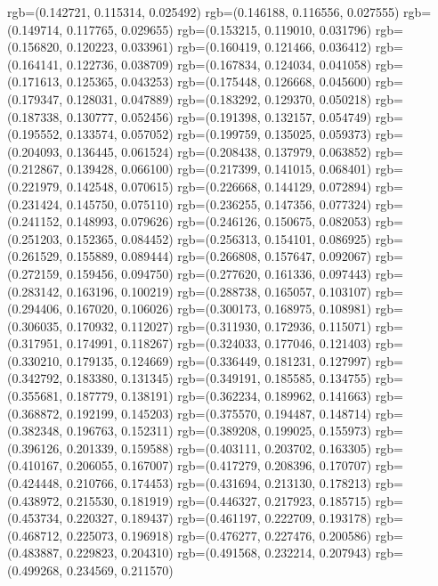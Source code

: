 {{{					rgb=(0.142721, 0.115314, 0.025492)
					rgb=(0.146188, 0.116556, 0.027555)
					rgb=(0.149714, 0.117765, 0.029655)
					rgb=(0.153215, 0.119010, 0.031796)
					rgb=(0.156820, 0.120223, 0.033961)
					rgb=(0.160419, 0.121466, 0.036412)
					rgb=(0.164141, 0.122736, 0.038709)
					rgb=(0.167834, 0.124034, 0.041058)
					rgb=(0.171613, 0.125365, 0.043253)
					rgb=(0.175448, 0.126668, 0.045600)
					rgb=(0.179347, 0.128031, 0.047889)
					rgb=(0.183292, 0.129370, 0.050218)
					rgb=(0.187338, 0.130777, 0.052456)
					rgb=(0.191398, 0.132157, 0.054749)
					rgb=(0.195552, 0.133574, 0.057052)
					rgb=(0.199759, 0.135025, 0.059373)
					rgb=(0.204093, 0.136445, 0.061524)
					rgb=(0.208438, 0.137979, 0.063852)
					rgb=(0.212867, 0.139428, 0.066100)
					rgb=(0.217399, 0.141015, 0.068401)
					rgb=(0.221979, 0.142548, 0.070615)
					rgb=(0.226668, 0.144129, 0.072894)
					rgb=(0.231424, 0.145750, 0.075110)
					rgb=(0.236255, 0.147356, 0.077324)
					rgb=(0.241152, 0.148993, 0.079626)
					rgb=(0.246126, 0.150675, 0.082053)
					rgb=(0.251203, 0.152365, 0.084452)
					rgb=(0.256313, 0.154101, 0.086925)
					rgb=(0.261529, 0.155889, 0.089444)
					rgb=(0.266808, 0.157647, 0.092067)
					rgb=(0.272159, 0.159456, 0.094750)
					rgb=(0.277620, 0.161336, 0.097443)
					rgb=(0.283142, 0.163196, 0.100219)
					rgb=(0.288738, 0.165057, 0.103107)
					rgb=(0.294406, 0.167020, 0.106026)
					rgb=(0.300173, 0.168975, 0.108981)
					rgb=(0.306035, 0.170932, 0.112027)
					rgb=(0.311930, 0.172936, 0.115071)
					rgb=(0.317951, 0.174991, 0.118267)
					rgb=(0.324033, 0.177046, 0.121403)
					rgb=(0.330210, 0.179135, 0.124669)
					rgb=(0.336449, 0.181231, 0.127997)
					rgb=(0.342792, 0.183380, 0.131345)
					rgb=(0.349191, 0.185585, 0.134755)
					rgb=(0.355681, 0.187779, 0.138191)
					rgb=(0.362234, 0.189962, 0.141663)
					rgb=(0.368872, 0.192199, 0.145203)
					rgb=(0.375570, 0.194487, 0.148714)
					rgb=(0.382348, 0.196763, 0.152311)
					rgb=(0.389208, 0.199025, 0.155973)
					rgb=(0.396126, 0.201339, 0.159588)
					rgb=(0.403111, 0.203702, 0.163305)
					rgb=(0.410167, 0.206055, 0.167007)
					rgb=(0.417279, 0.208396, 0.170707)
					rgb=(0.424448, 0.210766, 0.174453)
					rgb=(0.431694, 0.213130, 0.178213)
					rgb=(0.438972, 0.215530, 0.181919)
					rgb=(0.446327, 0.217923, 0.185715)
					rgb=(0.453734, 0.220327, 0.189437)
					rgb=(0.461197, 0.222709, 0.193178)
					rgb=(0.468712, 0.225073, 0.196918)
					rgb=(0.476277, 0.227476, 0.200586)
					rgb=(0.483887, 0.229823, 0.204310)
					rgb=(0.491568, 0.232214, 0.207943)
					rgb=(0.499268, 0.234569, 0.211570)
}}}

